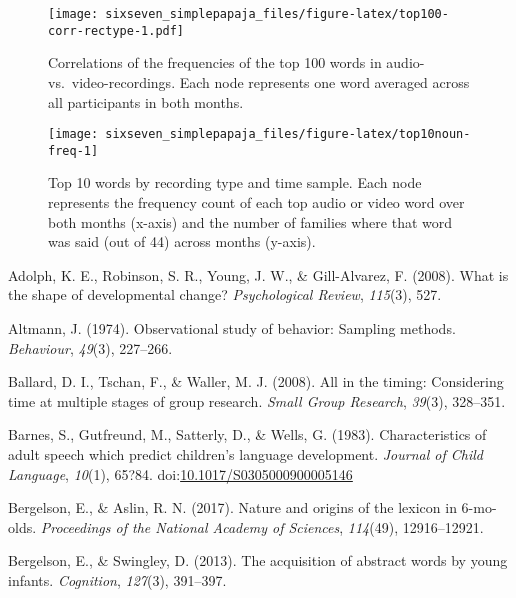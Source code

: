 \documentclass[man]{apa6}
\theoremstyle{definition}
\theoremstyle{definition}
\theoremstyle{definition}
\theoremstyle{remark}
\begin{document}
\begin{figure}
\centering
\texttt{[image: sixseven\_simplepapaja\_files/figure-latex/top100-corr-rectype-1.pdf]}
\caption{\label{fig:top100-corr-rectype}Correlations of the frequencies of
the top 100 words in audio- vs.~video-recordings. Each node represents
one word averaged across all participants in both months.}
\end{figure}

\begin{figure}
\texttt{[image: sixseven\_simplepapaja\_files/figure-latex/top10noun-freq-1]} \caption{Top 10 words by recording type and time sample. Each node represents the frequency count of each top audio or video word over both months (x-axis) and the number of families where that word was said (out of 44) across months (y-axis).}\label{fig:top10noun-freq}
\end{figure}

\setlength{\parindent}{-0.5in} \setlength{\leftskip}{0.5in}

\hypertarget{refs}{}
\hypertarget{ref-adolph2008shape}{}
Adolph, K. E., Robinson, S. R., Young, J. W., \& Gill-Alvarez, F.
(2008). What is the shape of developmental change? \emph{Psychological
Review}, \emph{115}(3), 527.

\hypertarget{ref-altmann1974observational}{}
Altmann, J. (1974). Observational study of behavior: Sampling methods.
\emph{Behaviour}, \emph{49}(3), 227--266.

\hypertarget{ref-ballard2008all}{}
Ballard, D. I., Tschan, F., \& Waller, M. J. (2008). All in the timing:
Considering time at multiple stages of group research. \emph{Small Group
Research}, \emph{39}(3), 328--351.

\hypertarget{ref-barnes1983characteristics}{}
Barnes, S., Gutfreund, M., Satterly, D., \& Wells, G. (1983).
Characteristics of adult speech which predict children's language
development. \emph{Journal of Child Language}, \emph{10}(1), 65?84.
doi:\href{https://doi.org/10.1017/S0305000900005146}{10.1017/S0305000900005146}

\hypertarget{ref-bergelson2017nature}{}
Bergelson, E., \& Aslin, R. N. (2017). Nature and origins of the lexicon
in 6-mo-olds. \emph{Proceedings of the National Academy of Sciences},
\emph{114}(49), 12916--12921.

\hypertarget{ref-bergelson2013acquisition}{}
Bergelson, E., \& Swingley, D. (2013). The acquisition of abstract words
by young infants. \emph{Cognition}, \emph{127}(3), 391--397.
\end{document}
